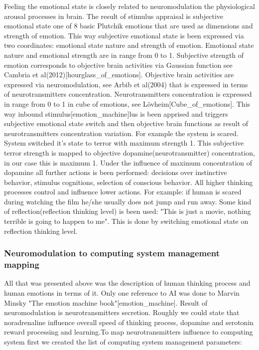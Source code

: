 Feeling the emotional state is closely related to neuromodulation the physiological arousal processes in brain. The result of stimulus appraisal is subjective emotional state one of 8 basic Plutchik emotions that are used as dimensions and strength of emotion. This way subjective emotional state is been expressed via two coordinates: emotional state nature and strength of emotion. Emotional state nature and emotional strength are in range from 0 to 1. Subjective strength of emotion corresponds to objective brain activities via Gaussian function see Cambria et al(2012)[hourglass_of_emotions]. Objective brain activities are expressed via neuromodulation, see Arbib et al(2004) that is expressed in terms of neurotransmitters concentration. Neurotransmitters  concentration is expressed in range from 0 to 1 in cube of emotions, see Lövheim[Cube_of_emotions]. This way inbound stimulus[emotion_machine]lus is been apprised and triggers subjective emotional state switch and then objective brain functions as result of neurotransmitters concentration variation. For example the system is scared. System switched it's state to terror with maximum strength 1. This subjective terror strength is mapped to objective dopamine(neurotransmitter) concentration, in our case this is maximum 1. Under the influence of maximum concentration of dopamine all further actions is been performed: decisions over instinctive behavior, stimulus cognitions, selection of conscious behavior. All higher thinking processes control and influence lower actions. For example: if human is scared during watching the film he/she usually does not jump and run away. Some kind of reflection(reflection thinking level) is been used: "This is just a movie, nothing terrible is going to happen to me". This is done by switching emotional state on reflection thinking level.

\subsubsection{Neuromodulation to computing system management mapping}

All that was presented above was the description of human thinking process and human emotions in terms of it. Only one reference to AI was done to Marvin Minsky "The emotion machine book"[emotion_machine]. Result of neuromodulation is neurotransmitters secretion. Roughly we could state that noradrenaline influence overall speed of thinking process, dopamine and serotonin reward processing and learning.To map neurotransmitters influence to computing system first we created the list of computing system management parameters:

